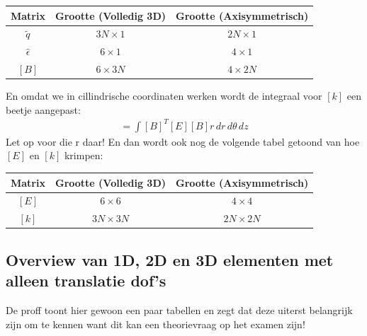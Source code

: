 \documentclass[a4paper,11pt,twoside]{report}
\begin{document}
\begin{table}[H]
    \centering

    \begin{tabular}{|c|c|c|}
        \hline
        \textbf{Matrix}  & \textbf{Grootte (Volledig 3D)} & \textbf{Grootte (Axisymmetrisch)} \\ \hline
        $\tilde{q}$      & $3N \times 1$                  & $2N \times 1$                     \\ \hline
        $\hat{\epsilon}$ & $6 \times 1$                   & $4 \times 1$                      \\ \hline
        $[B]$            & $6 \times 3N$                  & $4 \times 2N$                     \\ \hline
    \end{tabular}
\end{table}

En omdat we in cillindrische coordinaten werken wordt de integraal voor $[k]$ een beetje aangepast:
\begin{align*}
    [k] = \int [B]^T [E] [B] r \, dr \, d\theta \, dz
\end{align*}
Let op voor die r daar!
\newline
\newline
En dan wordt ook nog de volgende tabel getoond van hoe $[E]$ en $[k]$ krimpen:

\begin{table}[H]
    \centering

    \begin{tabular}{|c|c|c|}
        \hline
        \textbf{Matrix} & \textbf{Grootte (Volledig 3D)} & \textbf{Grootte (Axisymmetrisch)} \\ \hline
        $[E]$           & $6 \times 6$                   & $4 \times 4$                      \\ \hline
        $[k]$           & $3N \times 3N$                 & $2N \times 2N$                    \\ \hline
    \end{tabular}
\end{table}

\subsection{Overview van 1D, 2D en 3D elementen met alleen translatie dof's}
De proff toont hier gewoon een paar tabellen en zegt dat deze uiterst belangrijk zijn om te kennen
want dit kan een theorievraag op het examen zijn!
\end{document}
